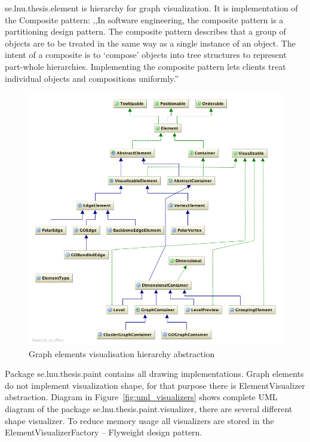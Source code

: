 \textsf{se.lnu.thesis.element} is hierarchy for graph visualization. It is implementation of the Composite pattern: ,,In software engineering, the composite pattern is a partitioning design pattern. The composite pattern describes that a group of objects are to be treated in the same way as a single instance of an object. The intent of a composite is to `compose' objects into tree structures to represent part-whole hierarchies. Implementing the composite pattern lets clients treat individual objects and compositions uniformly.''~\cite{COMPOSITE_GAMMA}

\begin{figure}[h!]
\centering
\includegraphics[scale=0.4]{pictures/uml_elements.png}
\caption{Graph elements visualisation hierarchy abstraction}
\label{fig:uml_elements}
\end{figure}

Package \textsf{se.lnu.thesis.paint} contains all drawing implementations.
Graph elements do not implement visualization shape, for that purpose there is \textsf{ElementVisualizer} abstraction. Diagram in Figure~\ref{fig:uml_visualizers} shows complete UML diagram of the package \textsf{se.lnu.thesis.paint.visualizer}, there are several different shape visualizer. To reduce memory usage all visualizers are stored in the \textsf{ElementVisualizerFactory} -- Flyweight design pattern.

